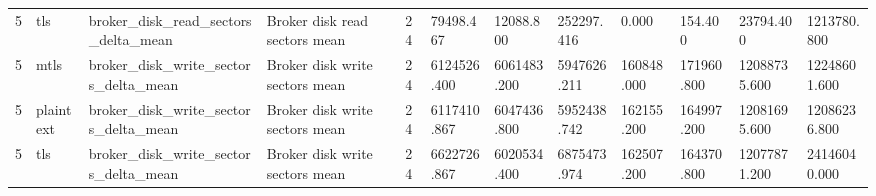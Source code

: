 \begin{longtable}{llllllllllll}
5 & tls & broker\_disk\_read\_sectors\_delta\_mean & Broker disk read sectors mean & 24 & 79498.467 & 12088.800 & 252297.416 & 0.000 & 154.400 & 23794.400 & 1213780.800 \\
5 & mtls & broker\_disk\_write\_sectors\_delta\_mean & Broker disk write sectors mean & 24 & 6124526.400 & 6061483.200 & 5947626.211 & 160848.000 & 171960.800 & 12088735.600 & 12248601.600 \\
5 & plaintext & broker\_disk\_write\_sectors\_delta\_mean & Broker disk write sectors mean & 24 & 6117410.867 & 6047436.800 & 5952438.742 & 162155.200 & 164997.200 & 12081695.600 & 12086236.800 \\
5 & tls & broker\_disk\_write\_sectors\_delta\_mean & Broker disk write sectors mean & 24 & 6622726.867 & 6020534.400 & 6875473.974 & 162507.200 & 164370.800 & 12077871.200 & 24146040.000 \\
\hline
\end{longtable}
